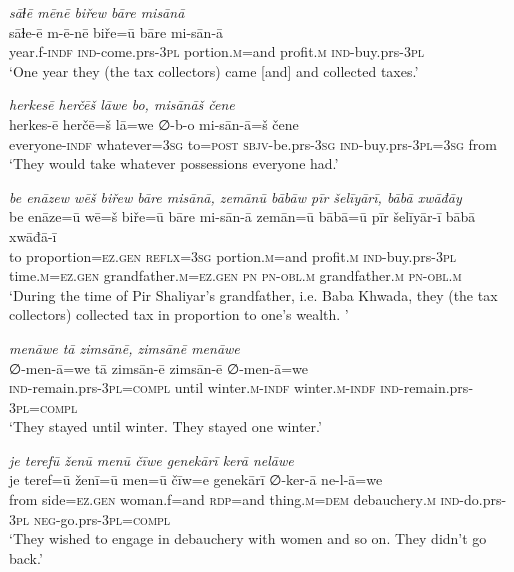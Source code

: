 \ea \label{BP.29}
\textit{sāɫē mēnē biřew bāre misānā} \\ 
\gll sāɫe-ē m-ē-nē biře=ū bāre mi-sān-ā \\ 
 year.f\textsc{-indf} \textsc{ind-}come.prs\textsc{-3pl} portion\textsc{.m}=and profit\textsc{.m} \textsc{ind-}buy.prs\textsc{-3pl} \\ 
\glt `One year they (the tax collectors) came [and] and collected taxes.'
\z 
 
\ea \label{BP.30}
\textit{herkesē herčēš lāwe bo, misānāš čene} \\ 
\gll herkes-ē herčē=š lā=we ∅-b-o mi-sān-ā=š čene \\ 
 everyone\textsc{-indf} whatever\textsc{=3sg} to\textsc{=\textsc{post}} \textsc{sbjv-}be.prs\textsc{-3sg} \textsc{ind-}buy.prs\textsc{-3pl}\textsc{=3sg} from \\ 
\glt `They would take whatever possessions everyone had.'
\z 
 
\ea \label{BP.31}
\textit{be enāzew wēš biřew bāre misānā, zemānū bābāw pīr šelīyārī, bābā xwāđāy} \\ 
\gll be enāze=ū wē=š biře=ū bāre mi-sān-ā zemān=ū bābā=ū pīr šelīyār-ī bābā xwāđā-ī \\ 
 to proportion\textsc{=ez.gen} \textsc{reflx}\textsc{=3sg} portion\textsc{.m}=and profit\textsc{.m} \textsc{ind-}buy.prs\textsc{-3pl} time\textsc{.m}\textsc{=ez.gen} grandfather\textsc{.m}\textsc{=ez.gen} \textsc{pn} \textsc{pn}\textsc{-obl}\textsc{.m} grandfather\textsc{.m} \textsc{pn}\textsc{-obl}\textsc{.m} \\ 
\glt `During the time of Pir Shaliyar’s grandfather, i.e. Baba Khwada, they (the tax collectors) collected tax in proportion to one’s wealth. '
\z 
 
\ea \label{BP.33}
\textit{menāwe tā zimsānē, zimsānē menāwe} \\ 
\gll ∅-men-ā=we tā zimsān-ē zimsān-ē ∅-men-ā=we \\ 
 \textsc{ind-}remain.prs\textsc{-3pl}\textsc{=compl} until winter\textsc{.m}\textsc{-indf} winter\textsc{.m}\textsc{-indf} \textsc{ind-}remain.prs\textsc{-3pl}\textsc{=compl} \\ 
\glt `They stayed until winter. They stayed one winter.'
\z 
 
\ea \label{BP.36}
\textit{je terefū ženū menū čīwe genekārī kerā nelāwe} \\ 
\gll je teref=ū ženī=ū men=ū čīw=e genekārī ∅-ker-ā ne-l-ā=we \\ 
 from side\textsc{=ez.gen} woman.f=and \textsc{rdp}=and thing\textsc{.m}\textsc{=dem} debauchery\textsc{.m} \textsc{ind-}do.prs\textsc{-3pl} \textsc{neg-}go.prs\textsc{-3pl}\textsc{=compl} \\ 
\glt `They wished to engage in debauchery with women and so on. They didn’t go back.'
\z 
 
